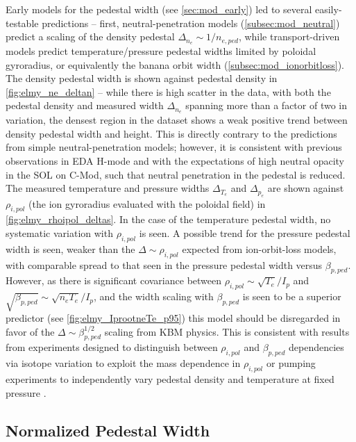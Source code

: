 Early models for the pedestal width (see \cref{sec:mod_early}) led to several easily-testable predictions -- first, neutral-penetration models (\cref{subsec:mod_neutral}) predict a scaling of the density pedestal $\Delta_{n_e} \sim 1/n_{e,ped}$, while transport-driven models predict temperature/pressure pedestal widths limited by poloidal gyroradius, or equivalently the banana orbit width (\cref{subsec:mod_ionorbitloss}).  The density pedestal width is shown against pedestal density in \cref{fig:elmy_ne_deltan} -- while there is high scatter in the data, with both the pedestal density and measured width $\Delta_{n_e}$ spanning more than a factor of two in variation, the densest region in the dataset shows a weak positive trend between density pedestal width and height.  This is directly contrary to the predictions from simple neutral-penetration models; however, it is consistent with previous observations in EDA H-mode \cite{Hughes2002} and with the expectations of high neutral opacity in the SOL on C-Mod, such that neutral penetration in the pedestal is reduced.  The measured temperature and pressure widths $\Delta_{T_e}$ and $\Delta_{p_e}$ are shown against $\rho_{i,pol}$ (the ion gyroradius evaluated with the poloidal field) in \cref{fig:elmy_rhoipol_deltas}.  In the case of the temperature pedestal width, no systematic variation with $\rho_{i,pol}$ is seen.  A possible trend for the pressure pedestal width is seen, weaker than the $\Delta \sim \rho_{i,pol}$ expected from ion-orbit-loss models, with comparable spread to that seen in the pressure pedestal width versus $\beta_{p,ped}$.  However, as there is significant covariance between $\rho_{i,pol} \sim \sqrt{T_e}/I_p$ and $\sqrt{\beta_{p,ped}} \sim \sqrt{n_e T_e}/I_p$, and the width scaling with $\beta_{p,ped}$ is seen to be a superior predictor (see \cref{fig:elmy_IprootneTe_p95}) this model should be disregarded in favor of the $\Delta \sim \beta_{p,ped}^{1/2}$ scaling from KBM physics.  This is consistent with results from experiments designed to distinguish between $\rho_{i,pol}$ and $\beta_{p,ped}$ dependencies via isotope variation to exploit the mass dependence in $\rho_{i,pol}$ \cite{Urano2008} or pumping experiments to independently vary pedestal density and temperature at fixed pressure \cite{Osborne1998,Maggi2010}.

\subsection{Normalized Pedestal Width}\label{subsec:elmy_normwidth}

